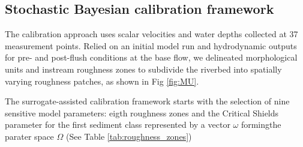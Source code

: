 \documentclass[draft,linenumbers,onecolumn]{agujournal2019} %
\begin{document}
%
%
%
%
%

\subsection{Stochastic Bayesian calibration framework}
{\label{sec:Sec2.7}} 

The calibration approach uses scalar velocities and water depths collected at 37 measurement points. Relied on an initial model run and hydrodynamic outputs for pre- and post-flush conditions at the base flow, we delineated morphological units and instream roughness zones to subdivide the riverbed into spatially varying roughness patches, as shown in Fig \ref{fig:MU}. 

The surrogate-assisted calibration framework starts with the selection of nine sensitive model parameters: eigth roughness zones and the Critical Shields parameter for the first sediment class represented by a vector $\omega$ formingthe parater space $\Omega$ (See Table \ref{tab:roughness_zones})
\end{document}
